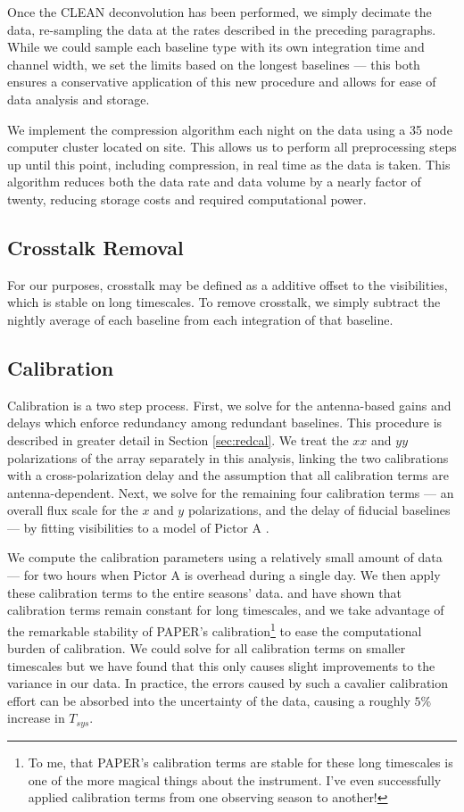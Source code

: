 Once the CLEAN deconvolution has been performed, we simply decimate the data, re-sampling the data at
the rates described in the preceding paragraphs. While we could sample each baseline type with its
own integration time and channel width, we set the limits based on the longest baselines --- this
both ensures a conservative application of this new procedure and allows for ease of data analysis
and storage.  

We implement the compression algorithm each night on the data using a 35 node computer cluster
located on site. This allows us to perform all preprocessing steps up until this point, including
compression, in real time as the data is taken. This algorithm reduces both the data rate and data 
volume by a nearly factor of twenty, reducing storage costs and required computational power.

\subsection{Crosstalk Removal} 

For our purposes, crosstalk may be defined as a additive offset to the visibilities, which is stable
on long timescales. To remove crosstalk, we simply subtract the nightly average of each baseline
from each integration of that baseline.

\subsection{Calibration}

Calibration is a two step process. First, we solve for the antenna-based gains and delays which
enforce redundancy among redundant baselines. This procedure is described in greater detail in
Section \ref{sec:redcal}. We treat the $xx$ and $yy$ polarizations of the array separately in this
analysis, linking the two calibrations with a cross-polarization delay and the assumption that all
calibration terms are antenna-dependent. Next, we solve for the remaining four calibration terms 
--- an overall flux scale for the $x$ and $y$ polarizations, and the delay of fiducial baselines ---
by fitting visibilities to a model of Pictor A \cite{Jacobs2013b}. 

We compute the calibration parameters using a relatively small amount of data --- for two hours
when Pictor A is overhead during a single day. We then apply these calibration terms to the
entire seasons' data. \citet{JacobsPHD} and \citet{Parsons2014} have shown that calibration terms
remain constant for long timescales, and we take advantage of the remarkable stability of PAPER's
calibration\footnote{To me, that PAPER's calibration terms are stable for these long timescales is
  one of the more magical things about the instrument. I've even successfully applied calibration 
  terms from one observing season to another!} to ease the computational burden of calibration. We
could solve for all calibration terms on smaller timescales but we have found that this only causes
slight improvements to the variance in our data. In practice, the errors caused by such a cavalier
calibration effort can be absorbed into the uncertainty of the data, causing a roughly $5\%$ 
increase in $T_{sys}$.

